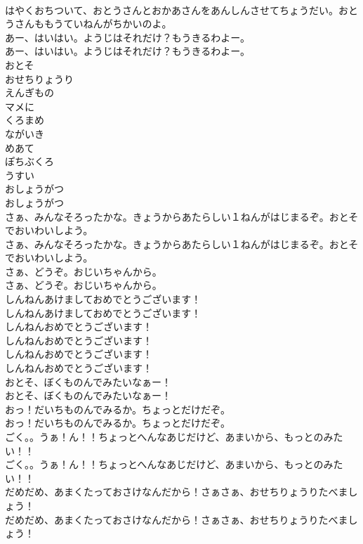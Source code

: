 \documentclass[8pt]{extreport}
\begin{document}
\begin{CJK}{UTF8}{min}
\\	はやくおちついて、おとうさんとおかあさんをあんしんさせてちょうだい。おとうさんももうていねんがちかいのよ。
\\	あー、はいはい。ようじはそれだけ？もうきるわよー。
\\	あー、はいはい。ようじはそれだけ？もうきるわよー。
\\	おとそ
\\	おせちりょうり
\\	えんぎもの
\\	マメに
\\	くろまめ
\\	ながいき
\\	めあて
\\	ぽちぶくろ
\\	うすい
\\	おしょうがつ
\\	おしょうがつ
\\	さぁ、みんなそろったかな。きょうからあたらしい１ねんがはじまるぞ。おとそでおいわいしよう。
\\	さぁ、みんなそろったかな。きょうからあたらしい１ねんがはじまるぞ。おとそでおいわいしよう。
\\	さぁ、どうぞ。おじいちゃんから。
\\	さぁ、どうぞ。おじいちゃんから。
\\	しんねんあけましておめでとうございます！
\\	しんねんあけましておめでとうございます！
\\	しんねんおめでとうございます！
\\	しんねんおめでとうございます！
\\	しんねんおめでとうございます！
\\	しんねんおめでとうございます！
\\	おとそ、ぼくものんでみたいなぁー！
\\	おとそ、ぼくものんでみたいなぁー！
\\	おっ！だいちものんでみるか。ちょっとだけだぞ。
\\	おっ！だいちものんでみるか。ちょっとだけだぞ。
\\	ごく。。うぁ！ん！！ちょっとへんなあじだけど、あまいから、もっとのみたい！！
\\	ごく。。うぁ！ん！！ちょっとへんなあじだけど、あまいから、もっとのみたい！！
\\	だめだめ、あまくたっておさけなんだから！さぁさぁ、おせちりょうりたべましょう！
\\	だめだめ、あまくたっておさけなんだから！さぁさぁ、おせちりょうりたべましょう！

\end{CJK}
\end{document}
